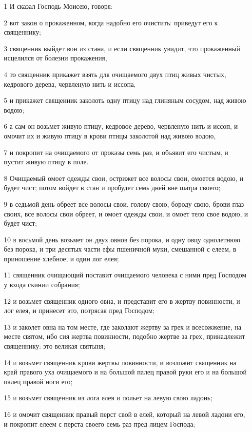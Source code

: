 \par 1 И сказал Господь Моисею, говоря:
\par 2 вот закон о прокаженном, когда надобно его очистить: приведут его к священнику;
\par 3 священник выйдет вон из стана, и если священник увидит, что прокаженный исцелился от болезни прокажения,
\par 4 то священник прикажет взять для очищаемого двух птиц живых чистых, кедрового дерева, червленую нить и иссопа,
\par 5 и прикажет священник заколоть одну птицу над глиняным сосудом, над живою водою;
\par 6 а сам он возьмет живую птицу, кедровое дерево, червленую нить и иссоп, и омочит их и живую птицу в крови птицы заколотой над живою водою,
\par 7 и покропит на очищаемого от проказы семь раз, и объявит его чистым, и пустит живую птицу в поле.
\par 8 Очищаемый омоет одежды свои, острижет все волосы свои, омоется водою, и будет чист; потом войдет в стан и пробудет семь дней вне шатра своего;
\par 9 в седьмой день обреет все волосы свои, голову свою, бороду свою, брови глаз своих, все волосы свои обреет, и омоет одежды свои, и омоет тело свое водою, и будет чист;
\par 10 в восьмой день возьмет он двух овнов без порока, и одну овцу однолетнюю без порока, и три десятых части ефы пшеничной муки, смешанной с елеем, в приношение хлебное, и один лог елея;
\par 11 священник очищающий поставит очищаемого человека с ними пред Господом у входа скинии собрания;
\par 12 и возьмет священник одного овна, и представит его в жертву повинности, и лог елея, и принесет это, потрясая пред Господом;
\par 13 и заколет овна на том месте, где заколают жертву за грех и всесожжение, на месте святом, ибо сия жертва повинности, подобно жертве за грех, принадлежит священнику: это великая святыня;
\par 14 и возьмет священник крови жертвы повинности, и возложит священник на край правого уха очищаемого и на большой палец правой руки его и на большой палец правой ноги его;
\par 15 и возьмет священник из лога елея и польет на левую свою ладонь;
\par 16 и омочит священник правый перст свой в елей, который на левой ладони его, и покропит елеем с перста своего семь раз пред лицем Господа;
